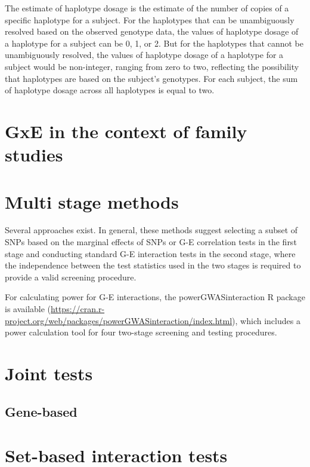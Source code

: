 \documentclass[
]{book}
\begin{document}
The estimate of haplotype dosage is the estimate of the number of copies of a specific haplotype for a subject. For the haplotypes that can be unambiguously resolved based on the observed genotype data, the values of haplotype dosage of a haplotype for a subject can be 0, 1, or 2. But for the haplotypes that cannot be unambiguously resolved, the values of haplotype dosage of a haplotype for a subject would be non-integer, ranging from zero to two, reflecting the possibility that haplotypes are based on the subject's genotypes. For each subject, the sum of haplotype dosage across all haplotypes is equal to two.

\hypertarget{gxe-in-the-context-of-family-studies}{%
\section{GxE in the context of family studies}\label{gxe-in-the-context-of-family-studies}}

\hypertarget{multi-stage-methods}{%
\section{Multi stage methods}\label{multi-stage-methods}}

Several approaches exist. In general, these methods suggest selecting a subset of SNPs based on the marginal effects of SNPs or G-E correlation tests in the first stage and conducting standard G-E interaction tests in the second stage, where the independence between the test statistics used in the two stages is required to provide a valid screening procedure.

For calculating power for G-E interactions, the powerGWASinteraction R package is available (\url{https://cran.r-project.org/web/packages/powerGWASinteraction/index.html}), which includes a power calculation tool for four two-stage screening and testing procedures.

\hypertarget{joint-tests}{%
\section{Joint tests}\label{joint-tests}}

\hypertarget{gene-based}{%
\subsection{Gene-based}\label{gene-based}}

\hypertarget{set-based-interaction-tests}{%
\section{Set-based interaction tests}\label{set-based-interaction-tests}}
\end{document}
